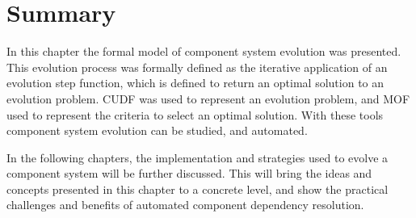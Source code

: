 \section{Summary}
In this chapter the formal model of component system evolution was presented.
This evolution process was formally defined as the iterative application of an evolution step function,
which is defined to return an optimal solution to an evolution problem.
CUDF was used to represent an evolution problem, and MOF used to represent the criteria to select an optimal solution.
With these tools component system evolution can be studied, and automated.

In the following chapters, the implementation and strategies used to evolve a component system will be further discussed.
This will bring the ideas and concepts presented in this chapter to a concrete level, and show the practical challenges and benefits of automated component dependency resolution. 